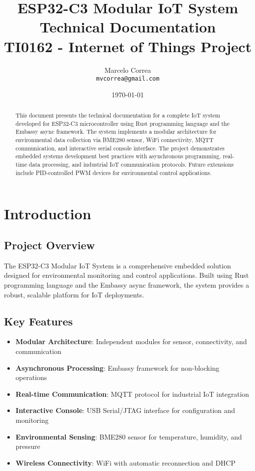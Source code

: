 \documentclass[12pt,a4paper]{article}
\title{
    \textbf{ESP32-C3 Modular IoT System} \\
    \large Technical Documentation \\
    \normalsize TI0162 - Internet of Things Project
}
\author{Marcelo Correa \\ \texttt{mvcorrea@gmail.com}}
\date{\today}
\begin{document}
\maketitle

\begin{abstract}
This document presents the technical documentation for a complete IoT system developed for ESP32-C3 microcontroller using Rust programming language and the Embassy async framework. The system implements a modular architecture for environmental data collection via BME280 sensor, WiFi connectivity, MQTT communication, and interactive serial console interface. The project demonstrates embedded systems development best practices with asynchronous programming, real-time data processing, and industrial IoT communication protocols. Future extensions include PID-controlled PWM devices for environmental control applications.
\end{abstract}

\tableofcontents
\newpage

\section{Introduction}

\subsection{Project Overview}
The ESP32-C3 Modular IoT System is a comprehensive embedded solution designed for environmental monitoring and control applications. Built using Rust programming language and the Embassy async framework, the system provides a robust, scalable platform for IoT deployments.

\subsection{Key Features}
\begin{itemize}
    \item \textbf{Modular Architecture}: Independent modules for sensor, connectivity, and communication
    \item \textbf{Asynchronous Processing}: Embassy framework for non-blocking operations
    \item \textbf{Real-time Communication}: MQTT protocol for industrial IoT integration
    \item \textbf{Interactive Console}: USB Serial/JTAG interface for configuration and monitoring
    \item \textbf{Environmental Sensing}: BME280 sensor for temperature, humidity, and pressure
    \item \textbf{Wireless Connectivity}: WiFi with automatic reconnection and DHCP
\end{itemize}
\end{document}
